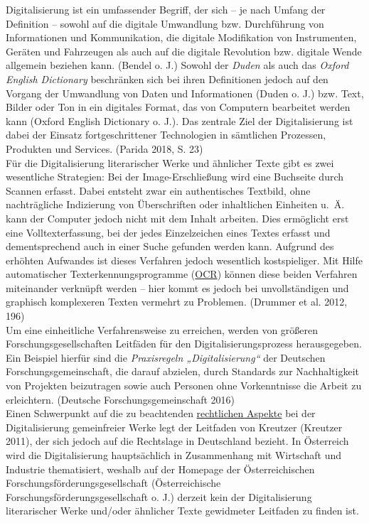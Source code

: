 \documentclass{article}
\begin{document}
    Digitalisierung ist ein umfassender Begriff, der sich – je nach Umfang der Definition – sowohl auf die digitale Umwandlung bzw. Durchführung von Informationen und Kommunikation, die digitale Modifikation von Instrumenten, Geräten und Fahrzeugen als auch auf die digitale Revolution bzw. digitale Wende allgemein beziehen kann. (Bendel o. J.) Sowohl der \emph{Duden} als auch das \emph{Oxford English Dictionary} beschränken sich bei ihren Definitionen jedoch auf den Vorgang der Umwandlung von Daten und Informationen (Duden o. J.) bzw. Text, Bilder oder Ton  in ein digitales Format, das von Computern bearbeitet werden kann (Oxford English Dictionary o. J.). Das zentrale Ziel der Digitalisierung ist dabei der Einsatz fortgeschrittener Technologien in sämtlichen Prozessen, Produkten und Services. (Parida 2018, S. 23)\\
            
        Für die Digitalisierung literarischer Werke und ähnlicher Texte gibt es zwei wesentliche Strategien: Bei der Image-Erschließung wird eine Buchseite durch Scannen erfasst. Dabei entsteht zwar ein authentisches Textbild, ohne nachträgliche Indizierung von Überschriften oder inhaltlichen Einheiten u. Ä. kann der Computer jedoch nicht mit dem Inhalt arbeiten. Dies ermöglicht erst eine Volltexterfassung, bei der jedes Einzelzeichen eines Textes erfasst und dementsprechend auch in einer Suche gefunden werden kann. Aufgrund des erhöhten Aufwandes ist dieses Verfahren jedoch wesentlich kostspieliger. Mit Hilfe automatischer Texterkennungsprogramme (\href{http://gams.uni-graz.at/o:konde.149}{OCR}) können diese beiden Verfahren miteinander verknüpft werden – hier kommt es jedoch bei unvollständigen und graphisch komplexeren Texten vermehrt zu Problemen. (Drummer et al. 2012, 196)\\
            
        Um eine einheitliche Verfahrensweise zu erreichen, werden von größeren Forschungsgesellschaften Leitfäden für den Digitalisierungsprozess herausgegeben. Ein Beispiel hierfür sind die \emph{Praxisregeln „Digitalisierung“} der Deutschen Forschungsgemeinschaft, die darauf abzielen, durch Standards zur Nachhaltigkeit von Projekten beizutragen sowie auch Personen ohne Vorkenntnisse die Arbeit zu erleichtern. (Deutsche Forschungsgemeinschaft 2016)\\
            
        Einen Schwerpunkt auf die zu beachtenden \href{http://gams.uni-graz.at/o:konde.223}{rechtlichen Aspekte} bei der Digitalisierung gemeinfreier Werke legt der Leitfaden von Kreutzer (Kreutzer 2011), der sich jedoch auf die Rechtslage in Deutschland bezieht. In Österreich wird die Digitalisierung hauptsächlich in Zusammenhang mit Wirtschaft und Industrie thematisiert, weshalb auf der Homepage der Österreichischen Forschungsförderungsgesellschaft (Österreichische Forschungsförderungsgesellschaft o. J.) derzeit kein der Digitalisierung literarischer Werke und/oder ähnlicher Texte gewidmeter Leitfaden zu finden ist.\\
            
\end{document}
